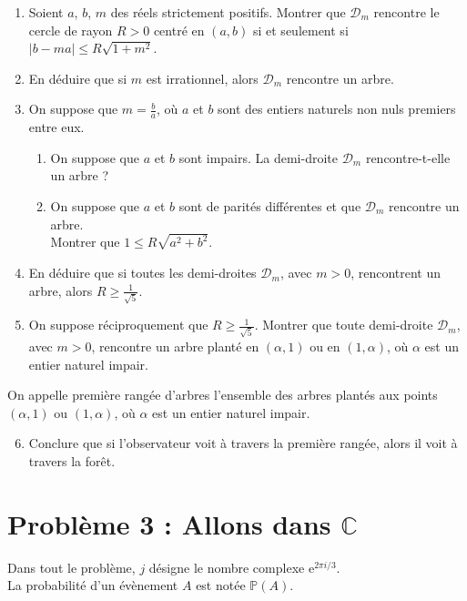 \documentclass[landscape,twocolumn,leqno,a4paper,10pt]{report} %
\newcommand\n{\noindent}
\renewcommand{\geq}{\geqslant}
\renewcommand{\leq}{\leqslant}
\newcommand{\e}{\mathrm{e}}
\newcommand{\Prob}{\mathbb{P}}
\begin{document}
\begin{enumerate}
	\item Soient $a$, $b$, $m$ des réels strictement positifs. Montrer que $\mathscr{D}_{m}$ rencontre le cercle de rayon $R>0$ centré en $(a, b)$ si et seulement si $|b-m a| \leq R \sqrt{1+m^{2}}$.
	\item En déduire que si $m$ est irrationnel, alors $\mathscr{D}_{m}$ rencontre un arbre.
	\item On suppose que $m=\frac{b}{a}$, où $a$ et $b$ sont des entiers naturels non nuls premiers entre eux.
	\begin{enumerate}
		\item On suppose que $a$ et $b$ sont impairs. La demi-droite $\mathscr{D}_{m}$ rencontre-t-elle un arbre ?
		\item On suppose que $a$ et $b$ sont de parités différentes et que $\mathscr{D}_{m}$ rencontre un arbre.\\
		Montrer que $1 \leq R \sqrt{a^{2}+b^{2}}$.
	\end{enumerate}
	\item En déduire que si toutes les demi-droites $\mathscr{D}_{m}$, avec $m>0$, rencontrent un arbre, alors $R \geq \frac{1}{\sqrt{5}}$.
	\item On suppose réciproquement que $R \geq \frac{1}{\sqrt{5}}$. Montrer que toute demi-droite $\mathscr{D}_{m}$, avec $m>0$, rencontre un arbre planté en $(\alpha, 1)$ ou en $(1, \alpha)$, où $\alpha$ est un entier naturel impair.
\end{enumerate}

\n On appelle première rangée d'arbres l'ensemble des arbres plantés aux points $(\alpha, 1)$ ou $(1, \alpha)$, où $\alpha$ est un entier naturel impair.

\begin{enumerate}\setcounter{enumi}{5}
	\item Conclure que si l'observateur voit à travers la première rangée, alors il voit à travers la forêt.
\end{enumerate}

\newpage


\section{Problème 3 : Allons dans $\mathbb{C}$}


\n Dans tout le problème, $j$ désigne le nombre complexe $\e^{2 \pi i / 3}$.\\
La probabilité d'un évènement $A$ est notée $\Prob(A)$.
\end{document}
